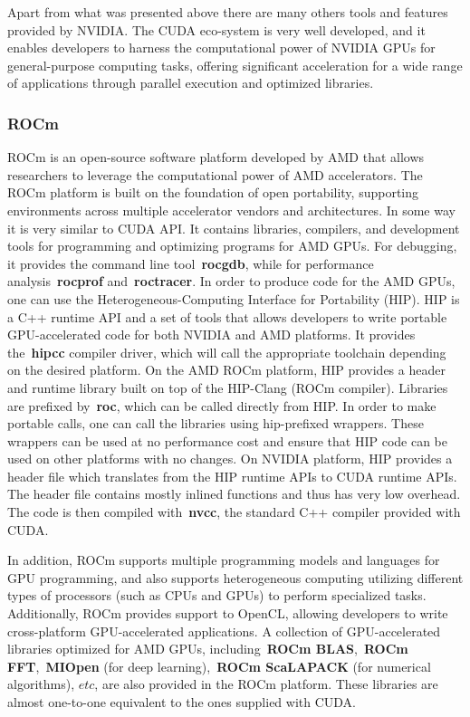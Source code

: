 \par
Apart from what was presented above there are many others tools and features provided by NVIDIA.
The CUDA eco-system is very well developed, and it enables developers to harness the computational power of NVIDIA GPUs for general-purpose computing tasks, offering significant acceleration for a wide range of applications through parallel execution and optimized libraries.


\subsubsection{ROCm}


\par
ROCm is an open-source software platform developed by AMD that allows researchers to leverage the computational power of AMD accelerators.
The ROCm platform is built on the foundation of open portability, supporting environments across multiple accelerator vendors and architectures.
In some way it is very similar to CUDA API. It contains libraries, compilers, and development tools for programming and optimizing programs for AMD GPUs. For debugging, it provides the command line tool~\textbf{rocgdb}, while for performance analysis~\textbf{rocprof} and~\textbf{roctracer}.
In order to produce code for the AMD GPUs, one can use the Heterogeneous-Computing Interface for Portability (HIP).
HIP is a C++ runtime API and a set of tools that allows developers to write portable GPU-accelerated code for both NVIDIA and AMD platforms.
It provides the~\textbf{hipcc} compiler driver, which will call the appropriate toolchain depending on the desired platform.
On the AMD ROCm platform, HIP provides a header and runtime library built on top of the HIP-Clang (ROCm compiler).
Libraries are prefixed by~\textbf{roc}, which can be called directly from HIP.
In order to make portable calls, one can call the libraries using hip-prefixed wrappers.
These wrappers can be used at no performance cost and ensure that HIP code can be used on other platforms with no changes.
On NVIDIA platform, HIP provides a header file which translates from the HIP runtime APIs to CUDA runtime APIs.
The header file contains mostly inlined functions and thus has very low overhead.
The code is then compiled with~\textbf{nvcc}, the standard C++ compiler provided with CUDA.


\par
In addition, ROCm supports multiple programming models and languages for GPU programming, and also supports heterogeneous computing utilizing different types of processors (such as CPUs and GPUs) to perform specialized tasks.
Additionally, ROCm provides support to OpenCL, allowing developers to write cross-platform GPU-accelerated applications.
A collection of GPU-accelerated libraries optimized for AMD GPUs, including~\textbf{ROCm BLAS},~\textbf{ROCm FFT},~\textbf{MIOpen} (for deep learning),~\textbf{ROCm ScaLAPACK} (for numerical algorithms), $etc$, are also provided in the ROCm platform.
These libraries are almost one-to-one equivalent to the ones supplied with CUDA.


